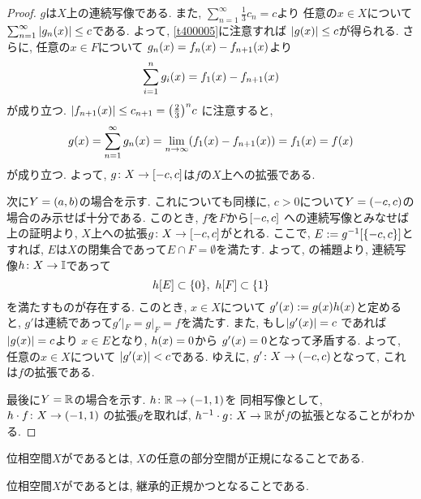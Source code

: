 \documentclass[uplatex, dvipdfmx, a4paper, 12pt, class=jsbook, crop=false]{standalone}
\begin{document}
\begin{proof}
	\( g \)は\( X \)上の連続写像である.
	また, \( \sum_{n=1}^{\infty} \frac{1}{3}c_n = c \)より
	任意の\( x \in X \)について
	\( \sum_{n=1}^\infty \abs{\mappt{g_n}{x}} \leq c \)である.
	よって, \cref{t400005}に注意すれば
	\( \abs{\mappt{g}{x}} \leq c\)が得られる.
	さらに, 任意の\( x \in F \)について
	\( \mappt{g_{n}}{x} = \mappt{f_n}{x} - \mappt{f_{n+1}}{x} \)より
	\[ \sum_{i=1}^{n} \mappt{g_i}{x} = \mappt{f_1}{x} - \mappt{f_{n+1}}{x} \]
	が成り立つ.
	\( \abs{\mappt{f_{n+1}}{x}} \leq c_{n+1}
	= \lrparen{\frac{2}{3}}^{n} c \)
	に注意すると,
	\[ \mappt{g}{x} = \sum_{n=1}^{\infty} \mappt{g_n}{x}
	= \lim_{n \to \infty} \lrparen{\mappt{f_1}{x}
	- \mappt{f_{n+1}}{x}} = \mappt{f_1}{x} = \mappt{f}{x} \]
	が成り立つ.
	よって, \( g\colon X\to\left[ -c , c \right] \)は\( f \)の\( X \)上への拡張である.

	次に\( Y = \left( a , b \right) \)の場合を示す.
	これについても同様に,
	\( c > 0 \)について\( Y = \left( -c , c \right) \)の場合のみ示せば十分である.
	このとき, \( f \)を\( F \)から\( \left[ -c , c \right] \)
	への連続写像とみなせば上の証明より,
	\( X \)上への拡張\( g\colon X\to\left[ -c , c \right] \)がとれる.
	ここで, \( E \defeq \mapinvset{g}{\lrbrace{-c,c}} \)とすれば,
	\( E \)は\( X \)の閉集合であって\( E \cap F = \emptyset \)を満たす.
	よって, \Urysohn の補題より,
	連続写像\( h\colon X\to\mathbb{I} \)であって
	\[ \mapset{h}{E} \subset \lrbrace{0}, \ \mapset{h}{F} \subset \lrbrace{1} \]
	を満たすものが存在する.
	このとき, \( x \in X \)について
	\( \mappt{g'}{x} \defeq \mappt{g}{x}\mappt{h}{x} \)と定めると,
	\( g' \)は連続であって\( g'|_F = g|_F = f \)を満たす.
	また, もし\( \abs{\mappt{g'}{x}} = c \)
	であれば\( \abs{\mappt{g}{x}} = c \)より
	\( x \in E \)となり, \( \mappt{h}{x} = 0 \)から
	\( \mappt{g'}{x} = 0 \)となって矛盾する.
	よって, 任意の\( x \in X \)について
	\( \abs{\mappt{g'}{x}} < c \)である.
	ゆえに, \( g'\colon X\to\left( -c , c \right) \)となって,
	これは\( f \)の拡張である.

	最後に\( Y = \mathbb{R} \)の場合を示す.
	\( h\colon\mathbb{R}\to\left( -1 , 1 \right) \)を
	同相写像として, \( h\cdot f\colon X\to\left( -1 , 1 \right) \)
	の拡張\( g \)を取れば,
	\( h^{-1}\cdot g\colon X\to\mathbb{R} \)が\( f \)の拡張となることがわかる.
\end{proof}


\begin{definition}
	位相空間$ X $がであるとは, $ X $の任意の部分空間が正規になることである.
\end{definition}

\begin{definition}
	位相空間$ X $がであるとは, 継承的正規かつとなることである.
\end{definition}
\end{document}
